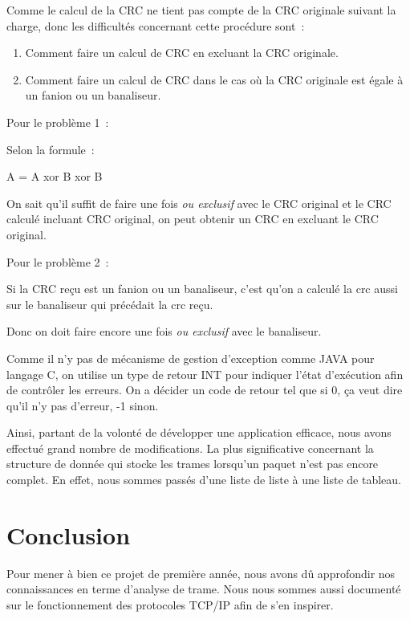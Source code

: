 \documentclass[a4paper,11pt]{article}
\begin{document}
Comme le calcul de la CRC ne tient pas compte de la CRC originale suivant la charge, donc les difficultés concernant cette procédure sont :
\begin{enumerate}
 \item Comment faire un calcul de CRC en excluant la CRC originale.
 \item Comment faire un calcul de CRC dans le cas où la CRC originale est égale à un fanion ou un banaliseur.
\end{enumerate}


\vspace{0.5cm}

Pour le problème 1 :

Selon la formule :

A = A xor B xor B

On sait qu'il suffit de faire une fois \textit{ou exclusif} avec le CRC original et le CRC calculé incluant CRC original, on peut obtenir un CRC  en excluant le CRC original.

Pour le problème 2 :

Si la CRC reçu est un fanion ou un banaliseur, c'est qu'on a
 calculé la crc aussi sur le banaliseur qui précédait la crc reçu.

Donc on doit faire encore une fois \textit{ou exclusif} avec le banaliseur.


Comme il n'y pas de mécanisme de gestion d'exception comme JAVA pour langage C, on utilise un type de retour INT pour indiquer l'état d'exécution afin de contrôler les erreurs.
On a décider un code de retour tel que si 0, ça veut dire qu'il n'y pas d'erreur, -1 sinon.

\vspace{0.5cm}

Ainsi, partant de la volonté de développer une application efficace, nous avons effectué grand nombre de modifications. La plus significative concernant la structure de donnée qui stocke les trames lorsqu'un paquet n'est pas encore complet. En effet, nous sommes passés d'une liste de liste à une liste de tableau.

\section{Conclusion}

Pour mener à bien ce projet de première année, nous avons dû approfondir nos connaissances en terme d'analyse de trame. Nous nous sommes aussi documenté sur le fonctionnement des protocoles TCP/IP afin de s'en inspirer.
\end{document}
